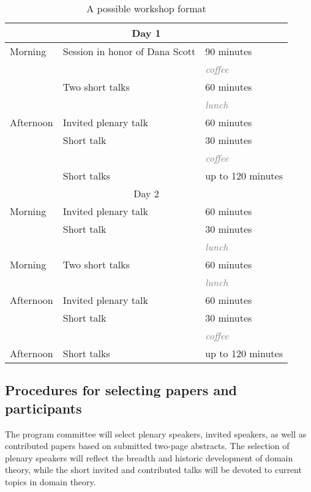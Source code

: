 \documentclass{article}
\newcommand{\grey}{\textcolor{grey}}
\begin{document}
\begin{table}[ht]
  \centering
\begin{tabular}{lll}
\multicolumn{3}{c}{Day 1} \\ \midrule
Morning   & Session in honor of Dana Scott & 90 minutes \\
          &                                & \grey{\emph{coffee}}\\
          & Two short talks                & 60 minutes \\
          &                                & \grey{\emph{lunch}} \\
Afternoon & Invited plenary talk           & 60 minutes \\
          & Short talk                     & 30 minutes \\
          &                                & \grey{\emph{coffee}} \\
          & Short talks                    & up to 120 minutes \\[2ex]
\multicolumn{3}{c}{Day 2} \\ \midrule
Morning   & Invited plenary talk           & 60 minutes \\
          & Short talk                     & 30 minutes \\
          &                                & \grey{\emph{lunch}}  \\
Morning   & Two short talks                & 60 minutes \\
          &                                & \grey{\emph{lunch}}  \\
Afternoon & Invited plenary talk           & 60 minutes \\
          & Short talk                     & 30 minutes \\
          &                                & \grey{\emph{coffee}} \\
Afternoon & Short talks                    & up to 120 minutes \\
\end{tabular}
  \caption{A possible workshop format}
  \label{tab:layout}
\end{table}

\subsection{Procedures for selecting papers and participants}

The program committee will select plenary speakers, invited speakers, as well as
contributed papers based on submitted two-page abstracts. The selection of plenary
speakers will reflect the breadth and historic development of domain theory, while the
short invited and contributed talks will be devoted to current topics in domain theory.
\end{document}
